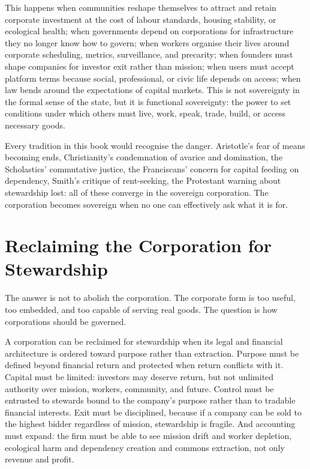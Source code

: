 \documentclass[11pt,a4paper,oneside]{book}
\begin{document}
This happens when communities reshape themselves to attract and retain corporate investment at the cost of labour standards, housing stability, or ecological health; when governments depend on corporations for infrastructure they no longer know how to govern; when workers organise their lives around corporate scheduling, metrics, surveillance, and precarity; when founders must shape companies for investor exit rather than mission; when users must accept platform terms because social, professional, or civic life depends on access; when law bends around the expectations of capital markets. This is not sovereignty in the formal sense of the state, but it is functional sovereignty: the power to set conditions under which others must live, work, speak, trade, build, or access necessary goods.

Every tradition in this book would recognise the danger. Aristotle's fear of means becoming ends, Christianity's condemnation of avarice and domination, the Scholastics' commutative justice, the Franciscans' concern for capital feeding on dependency, Smith's critique of rent-seeking, the Protestant warning about stewardship lost: all of these converge in the sovereign corporation. The corporation becomes sovereign when no one can effectively ask what it is for.

\section*{Reclaiming the Corporation for Stewardship}

The answer is not to abolish the corporation. The corporate form is too useful, too embedded, and too capable of serving real goods. The question is how corporations should be governed.

A corporation can be reclaimed for stewardship when its legal and financial architecture is ordered toward purpose rather than extraction. Purpose must be defined beyond financial return and protected when return conflicts with it. Capital must be limited: investors may deserve return, but not unlimited authority over mission, workers, community, and future. Control must be entrusted to stewards bound to the company's purpose rather than to tradable financial interests. Exit must be disciplined, because if a company can be sold to the highest bidder regardless of mission, stewardship is fragile. And accounting must expand: the firm must be able to see mission drift and worker depletion, ecological harm and dependency creation and commons extraction, not only revenue and profit.
\end{document}

